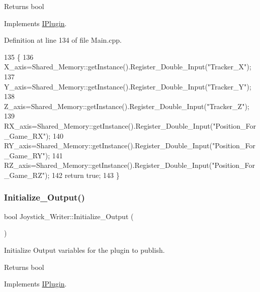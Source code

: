 \begin{DoxyReturn}{Returns}
bool 
\end{DoxyReturn}


Implements \hyperlink{class_i_plugin_aa7c66743ad956d8ada57becee559af4d}{I\+Plugin}.



Definition at line 134 of file Main.\+cpp.


\begin{DoxyCode}
135 \{
136     X\_axis=Shared\_Memory::getInstance().Register\_Double\_Input(\textcolor{stringliteral}{"Tracker\_X"});
137     Y\_axis=Shared\_Memory::getInstance().Register\_Double\_Input(\textcolor{stringliteral}{"Tracker\_Y"});
138     Z\_axis=Shared\_Memory::getInstance().Register\_Double\_Input(\textcolor{stringliteral}{"Tracker\_Z"});
139     RX\_axis=Shared\_Memory::getInstance().Register\_Double\_Input(\textcolor{stringliteral}{"Position\_For\_Game\_RX"});
140     RY\_axis=Shared\_Memory::getInstance().Register\_Double\_Input(\textcolor{stringliteral}{"Position\_For\_Game\_RY"});
141     RZ\_axis=Shared\_Memory::getInstance().Register\_Double\_Input(\textcolor{stringliteral}{"Position\_For\_Game\_RZ"});
142     \textcolor{keywordflow}{return} \textcolor{keyword}{true};
143 \}
\end{DoxyCode}
\mbox{\label{class_joystick___writer_a3b341bb82658ee52172b22d90a18628f}} 
\subsubsection{\texorpdfstring{Initialize\+\_\+\+Output()}{Initialize\_Output()}}
{\footnotesize\ttfamily bool Joystick\+\_\+\+Writer\+::\+Initialize\+\_\+\+Output (\begin{DoxyParamCaption}{ }\end{DoxyParamCaption})\hspace{0.3cm}{\ttfamily [virtual]}}



Initialize Output variables for the plugin to publish. 

\begin{DoxyReturn}{Returns}
bool 
\end{DoxyReturn}


Implements \hyperlink{class_i_plugin_a0b772513fc8c4ed01240e19c4bb84068}{I\+Plugin}.



